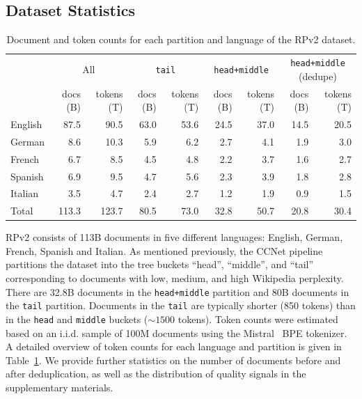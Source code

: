 \documentclass{article}
\begin{document}
\subsection{Dataset Statistics}
\begin{table}[!tbp]
\centering
\caption{Document and token counts for each partition and language of the RPv2 dataset.}
\small
\setlength{\tabcolsep}{4pt}
\begin{tabular}{l rr rr rr rr}
     \toprule
     & \multicolumn{2}{c}{All} & \multicolumn{2}{c}{\texttt{tail}} & \multicolumn{2}{c}{\texttt{head+middle}} & \multicolumn{2}{c}{\texttt{head+middle} (dedupe)} \\
     \cmidrule(lr){2-3} \cmidrule(lr){4-5} \cmidrule(lr){6-7} \cmidrule(lr){8-9}
     & docs (B) & tokens (T) & docs (B) & tokens (T) & docs (B) & tokens (T) & docs (B) & tokens (T) \\
     \midrule
     English & 87.5 & 90.5 & 63.0 & 53.6 & 24.5 & 37.0 & 14.5 & 20.5\\
     German  & 8.6  & 10.3 & 5.9 & 6.2 & 2.7 & 4.1 & 1.9 & 3.0 \\
     French  & 6.7  & 8.5 & 4.5 & 4.8 & 2.2 & 3.7 & 1.6 & 2.7\\
     Spanish & 6.9  & 9.5 & 4.7 & 5.6 & 2.3 & 3.9 & 1.8 & 2.8\\
     Italian & 3.5  & 4.7 & 2.4 & 2.7 & 1.2 & 1.9 & 0.9 & 1.5\\
     \midrule
     Total & 113.3 & 123.7 & 80.5 & 73.0 & 32.8 & 50.7 & 20.8 & 30.4\\
     \bottomrule
\end{tabular}
\label{tab:rpv2-statistics}
\end{table}
RPv2 consists of 113B documents in five different languages: English, German, French, Spanish and Italian. As mentioned previously, the CCNet pipeline partitions the dataset into the tree buckets ``head'', ``middle'', and ``tail'' corresponding to documents with low, medium, and high Wikipedia perplexity. There are 32.8B documents in the \texttt{head+middle} partition and 80B documents in the \texttt{tail} partition. Documents in the \texttt{tail} are typically shorter (850 tokens) than in the \texttt{head} and \texttt{middle} buckets ($\sim1500$ tokens). Token counts were estimated based on an i.i.d. sample of 100M documents using the Mistral~\cite{jiang2023mistral} BPE tokenizer. A detailed overview of token counts for each language and partition is given in Table~\ref{tab:rpv2-statistics}.
We provide further statistics on the number of documents before and after deduplication, as well as the distribution of quality signals in the supplementary materials.
\end{document}
